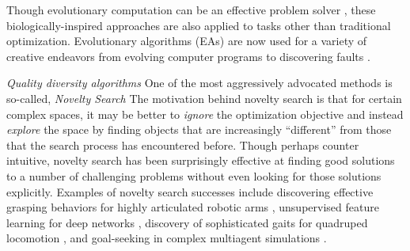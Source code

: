 \documentclass[twoside]{article}
\begin{document}
Though evolutionary computation can be an effective problem solver \citep{ec:DeJong2006}, 
these biologically-inspired approaches are also applied to tasks other than traditional optimization.  Evolutionary algorithms (EAs) are now used for a variety of creative endeavors from evolving computer programs \citep{ec:LangdonPoli2002}
 to discovering faults \citep{HanesWiegand2019tor,Mourad2000srds}.%

\emph{Quality diversity algorithms}  One of the most aggressively advocated methods is so-called, \emph{Novelty Search} \citep{StanleyLehman2015,Lehman2013gecco,LehmanStanley2011cec,LehmanStanley2008ssls}  The motivation behind novelty search is that for certain complex spaces, it may be better to \emph{ignore} the optimization objective and instead \emph{explore} the space by finding objects that are increasingly ``different'' from those that the search process has encountered before.  Though perhaps counter intuitive, novelty search has been surprisingly effective at finding good solutions to a number of challenging problems without even looking for those solutions explicitly.  Examples of novelty search successes include discovering effective grasping behaviors for highly articulated robotic arms \citep{Huang2014cica}, unsupervised feature learning for deep networks \citep{Szerlip2015cai}, discovery of sophisticated gaits for quadruped locomotion \citep{Morse2013acgec}, and goal-seeking in complex multiagent simulations \citep{Lehman2011ecj}.
\end{document}
